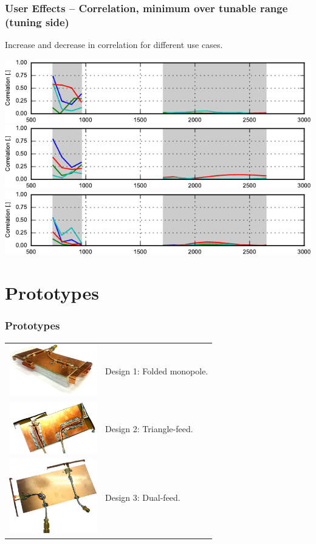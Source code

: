\begin{frame}
    \frametitle{User Effects -- Correlation, minimum over tunable range (tuning side)}
    Increase and decrease in correlation for different use cases.
    \emptyline
    \begin{center}
        \includegraphics{img/soren/ue/design1lt/corrside.pdf}\\
        \includegraphics{img/soren/ue/design2sn/corrside.pdf}\\
        \includegraphics{img/soren/ue/design3hv/corrside.pdf}
    \end{center}
    \legendfooter
\end{frame}

\section{Prototypes}
\begin{frame}
    \frametitle{Prototypes}
    \begin{tabular}{m{2in}m{2in}}
        \includegraphics[width=1.5in]{img/soren/proto/design1} & Design 1: Folded monopole.\\
        \includegraphics[width=1.5in]{img/soren/proto/design2} & Design 2: Triangle-feed.\\
        \includegraphics[width=1.5in]{img/soren/proto/design3} & Design 3: Dual-feed.
    \end{tabular}
\end{frame}

